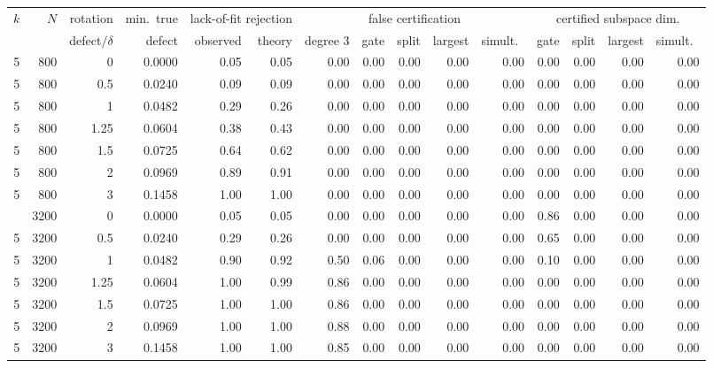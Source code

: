 \begin{table}[!htbp]
\centering\scriptsize
\begin{adjustbox}{max width=\textwidth, max totalheight=0.74\textheight}
\begin{tabular}{rrrrrrrrrrrrrrr}
\toprule
$k$ & $N$ & rotation & min.\ true & \multicolumn{2}{c}{lack-of-fit rejection} & \multicolumn{5}{c}{false certification} & \multicolumn{4}{c}{certified subspace dim.} \\
\cmidrule(lr){5-6}\cmidrule(lr){7-11}\cmidrule(lr){12-15}
 & & defect$/\delta$ & defect & observed & theory & degree 3 & gate & split & largest & simult.\ & gate & split & largest & simult.\ \\
\midrule
5 & 800 & 0 & 0.0000 & 0.05 & 0.05 & 0.00 & 0.00 & 0.00 & 0.00 & 0.00 & 0.00 & 0.00 & 0.00 & 0.00 \\
5 & 800 & 0.5 & 0.0240 & 0.09 & 0.09 & 0.00 & 0.00 & 0.00 & 0.00 & 0.00 & 0.00 & 0.00 & 0.00 & 0.00 \\
5 & 800 & 1 & 0.0482 & 0.29 & 0.26 & 0.00 & 0.00 & 0.00 & 0.00 & 0.00 & 0.00 & 0.00 & 0.00 & 0.00 \\
5 & 800 & 1.25 & 0.0604 & 0.38 & 0.43 & 0.00 & 0.00 & 0.00 & 0.00 & 0.00 & 0.00 & 0.00 & 0.00 & 0.00 \\
5 & 800 & 1.5 & 0.0725 & 0.64 & 0.62 & 0.00 & 0.00 & 0.00 & 0.00 & 0.00 & 0.00 & 0.00 & 0.00 & 0.00 \\
5 & 800 & 2 & 0.0969 & 0.89 & 0.91 & 0.00 & 0.00 & 0.00 & 0.00 & 0.00 & 0.00 & 0.00 & 0.00 & 0.00 \\
5 & 800 & 3 & 0.1458 & 1.00 & 1.00 & 0.00 & 0.00 & 0.00 & 0.00 & 0.00 & 0.00 & 0.00 & 0.00 & 0.00 \\
\addlinespace
5 & 3200 & 0 & 0.0000 & 0.05 & 0.05 & 0.00 & 0.00 & 0.00 & 0.00 & 0.00 & 0.86 & 0.00 & 0.00 & 0.00 \\
5 & 3200 & 0.5 & 0.0240 & 0.29 & 0.26 & 0.00 & 0.00 & 0.00 & 0.00 & 0.00 & 0.65 & 0.00 & 0.00 & 0.00 \\
5 & 3200 & 1 & 0.0482 & 0.90 & 0.92 & 0.50 & 0.06 & 0.00 & 0.00 & 0.00 & 0.10 & 0.00 & 0.00 & 0.00 \\
5 & 3200 & 1.25 & 0.0604 & 1.00 & 0.99 & 0.86 & 0.00 & 0.00 & 0.00 & 0.00 & 0.00 & 0.00 & 0.00 & 0.00 \\
5 & 3200 & 1.5 & 0.0725 & 1.00 & 1.00 & 0.86 & 0.00 & 0.00 & 0.00 & 0.00 & 0.00 & 0.00 & 0.00 & 0.00 \\
5 & 3200 & 2 & 0.0969 & 1.00 & 1.00 & 0.88 & 0.00 & 0.00 & 0.00 & 0.00 & 0.00 & 0.00 & 0.00 & 0.00 \\
5 & 3200 & 3 & 0.1458 & 1.00 & 1.00 & 0.85 & 0.00 & 0.00 & 0.00 & 0.00 & 0.00 & 0.00 & 0.00 & 0.00 \\

\end{tabular}
\end{adjustbox}
\end{table}
